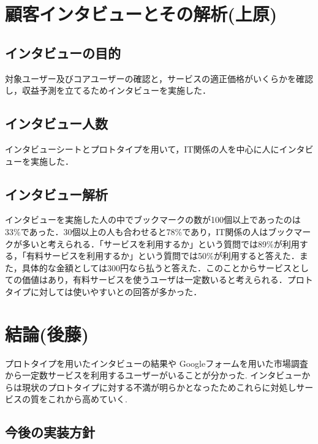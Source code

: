 \documentclass[a4paper,10pt,fleqn]{jsarticle}
\begin{document}
\newpage

\section{顧客インタビューとその解析(上原)}

\subsection{インタビューの目的}
対象ユーザー及びコアユーザーの確認と，サービスの適正価格がいくらかを確認し，収益予測を立てるためインタビューを実施した．

\subsection{インタビュー人数}
インタビューシートとプロトタイプを用いて，IT関係の人を中心に人にインタビューを実施した．

\subsection{インタビュー解析}
インタビューを実施した人の中でブックマークの数が100個以上であったのは33\%であった．30個以上の人も合わせると78\%であり，IT関係の人はブックマークが多いと考えられる．「サービスを利用するか」という質問では89\%が利用する，「有料サービスを利用するか」という質問では50\%が利用すると答えた．また，具体的な金額としては300円なら払うと答えた．このことからサービスとしての価値はあり，有料サービスを使うユーザは一定数いると考えられる．プロトタイプに対しては使いやすいとの回答が多かった．

\section{結論(後藤)}
プロトタイプを用いたインタビューの結果や
Googleフォームを用いた市場調査から一定数サービスを利用するユーザーがいることが分かった.
インタビューからは現状のプロトタイプに対する不満が明らかとなったためこれらに対処しサービスの質をこれから高めていく.

\subsection{今後の実装方針}
\end{document}
